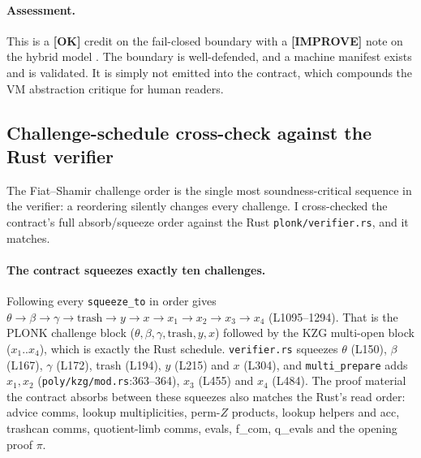 \paragraph{Assessment.} This is a
\textcolor{tracegreen}{\textbf{[OK]}} credit on the fail-closed
boundary with a
\textcolor{codegenblue}{\textbf{[IMPROVE]}} note on the hybrid
model . The boundary is well-defended, and a
machine manifest exists and is validated. It is simply not
emitted into the contract, which compounds the VM abstraction
critique for human readers.

\subsection{Challenge-schedule cross-check against the Rust verifier}
\label{sec:pr-challenge-schedule}

The Fiat--Shamir challenge order is the single most
soundness-critical sequence in the verifier: a reordering
silently changes every challenge. I cross-checked the contract's
full absorb/squeeze order against the Rust
\texttt{plonk/verifier.rs}, and it matches.

\paragraph{The contract squeezes exactly ten challenges.}
Following every \texttt{squeeze\_to} in order gives
$\theta \to \beta \to \gamma \to \text{trash} \to y \to x \to
x_1 \to x_2 \to x_3 \to x_4$ (L1095--1294). That is the PLONK
challenge block ($\theta,\beta,\gamma,\text{trash},y,x$) followed
by the KZG multi-open block ($x_1..x_4$), which is exactly the Rust
schedule. \texttt{verifier.rs} squeezes
$\theta$ (L150), $\beta$ (L167), $\gamma$ (L172),
trash (L194), $y$ (L215) and $x$ (L304), and \texttt{multi\_prepare}
adds $x_1,x_2$ (\texttt{poly/kzg/mod.rs}:363--364), $x_3$ (L455)
and $x_4$ (L484). The proof material the contract absorbs between
these squeezes also matches the Rust's read order: advice comms,
lookup multiplicities, perm-$Z$ products, lookup helpers and acc,
trashcan comms, quotient-limb comms, evals, f\_com, q\_evals and
the opening proof $\pi$.

